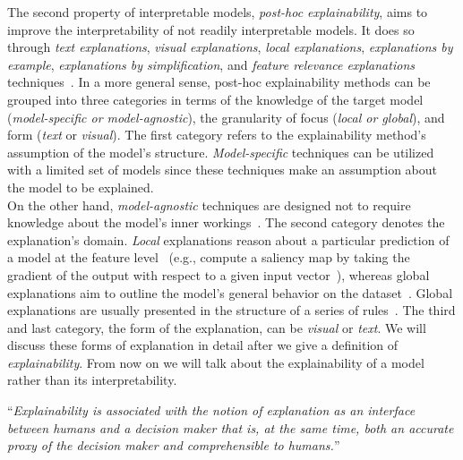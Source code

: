 The second property of interpretable models, \emph{post-hoc explainability}, aims to improve the interpretability of not readily interpretable models. It does so through \emph{text explanations}, \emph{visual explanations}, \emph{local explanations}, \emph{explanations by example}, \emph{explanations by simplification}, and \emph{feature relevance explanations} techniques~\parencite{TheMythosOfModelInterpretability_Lipton, XAIConceptsTaxonomies_Arrieta}. In a more general sense, post-hoc explainability methods can be grouped into three categories in terms of the knowledge of the target model (\emph{model-specific or model-agnostic}), the granularity of focus (\emph{local or global}), and form (\emph{text} or \emph{visual}). The first category refers to the explainability method's assumption of the model's structure. \emph{Model-specific} techniques can be utilized with a limited set of models since these techniques make an assumption about the model to be explained.\\
On the other hand, \emph{model-agnostic} techniques are designed not to require knowledge about the model's inner workings~\parencite{XAIConceptsTaxonomies_Arrieta, ASurveyOfMethodsForExplainingBlackBoxModels_Guidotti}. The second category denotes the explanation's domain. \emph{Local} explanations reason about a particular prediction of a model at the feature level~\parencite{TowardsARigorousScienceML_Velez} (e.g., compute a saliency map by taking the gradient of the output with respect to a given input vector~\parencite{TheMythosOfModelInterpretability_Lipton}), whereas global explanations aim to outline the model's general behavior on the dataset~\parencite{XAIConceptsTaxonomies_Arrieta, ASurveyOfMethodsForExplainingBlackBoxModels_Guidotti,TowardsARigorousScienceML_Velez}. Global explanations are usually presented in the structure of a series of rules~\parencite{InterpretableDecisionSets_Lakkaraju}. The third and last category, the form of the explanation, can be \emph{visual} or \emph{text}. We will discuss these forms of explanation in detail after we give a definition of \emph{explainability}. From now on we will talk about the explainability of a model rather than its interpretability.
\begin{definition}[Explainability]
    “\emph{Explainability is associated with the notion of explanation as an interface between humans and a decision maker that is, at the same time, both an accurate proxy of the decision maker and comprehensible to humans.}”~\parencite{XAIConceptsTaxonomies_Arrieta}
\end{definition}
